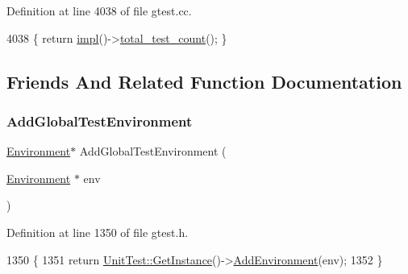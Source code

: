 Definition at line 4038 of file gtest.\+cc.


\begin{DoxyCode}
4038 \{ \textcolor{keywordflow}{return} \hyperlink{classtesting_1_1UnitTest_a4df5d11a58affb337d7fa62eaa07690e}{impl}()->\hyperlink{classtesting_1_1internal_1_1UnitTestImpl_a89e8531ee2ba3f0aadc27a95ac6149f1}{total\_test\_count}(); \}
\end{DoxyCode}


\subsection{Friends And Related Function Documentation}
\mbox{\label{classtesting_1_1UnitTest_a5ec26e4c31220ff8e769cc09689a4d6d}} 
\subsubsection{\texorpdfstring{Add\+Global\+Test\+Environment}{AddGlobalTestEnvironment}}
{\footnotesize\ttfamily \hyperlink{classtesting_1_1Environment}{Environment}$\ast$ Add\+Global\+Test\+Environment (\begin{DoxyParamCaption}\item[{\hyperlink{classtesting_1_1Environment}{Environment} $\ast$}]{env }\end{DoxyParamCaption})\hspace{0.3cm}{\ttfamily [friend]}}



Definition at line 1350 of file gtest.\+h.


\begin{DoxyCode}
1350                                                                \{
1351   \textcolor{keywordflow}{return} \hyperlink{classtesting_1_1UnitTest_a24192400b70b3b946746954e9574fb8e}{UnitTest::GetInstance}()->\hyperlink{classtesting_1_1UnitTest_a1eb8e999b8696889bf1c64b4f0161203}{AddEnvironment}(env);
1352 \}
\end{DoxyCode}
\mbox{\label{classtesting_1_1UnitTest_a183151aa061362c87572e743fe233db1}} 
